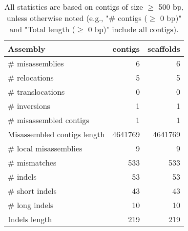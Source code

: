 \documentclass[12pt,a4paper]{article}
\begin{document}
\begin{table}[ht]
\begin{center}
\caption{All statistics are based on contigs of size $\geq$ 500 bp, unless otherwise noted (e.g., "\# contigs ($\geq$ 0 bp)" and "Total length ($\geq$ 0 bp)" include all contigs).}
\begin{tabular}{|l*{2}{|r}|}
\hline
Assembly & contigs & scaffolds \\ \hline
\# misassemblies & 6 & 6 \\ \hline
\hspace{5mm}\# relocations & 5 & 5 \\ \hline
\hspace{5mm}\# translocations & 0 & 0 \\ \hline
\hspace{5mm}\# inversions & 1 & 1 \\ \hline
\# misassembled contigs & 1 & 1 \\ \hline
Misassembled contigs length & 4641769 & 4641769 \\ \hline
\# local misassemblies & 9 & 9 \\ \hline
\# mismatches & 533 & 533 \\ \hline
\# indels & 53 & 53 \\ \hline
\hspace{5mm}\# short indels & 43 & 43 \\ \hline
\hspace{5mm}\# long indels & 10 & 10 \\ \hline
Indels length & 219 & 219 \\ \hline
\end{tabular}
\end{center}
\end{table}
\end{document}
